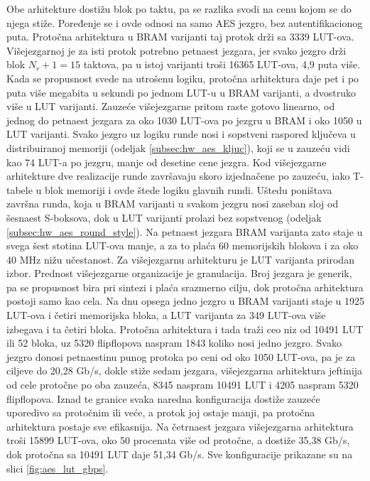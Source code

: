 Obe arhitekture dostižu blok po taktu, pa se razlika svodi na cenu kojom se do njega stiže. Poređenje se i ovde odnosi na samo AES jezgro, bez autentifikacionog puta. Protočna arhitektura u BRAM varijanti taj protok drži sa 3339 LUT-ova. Višejezgarnoj je za isti protok potrebno petnaest jezgara, jer svako jezgro drži blok $N_r + 1 = 15$ taktova, pa u istoj varijanti troši 16365 LUT-ova, 4,9 puta više. Kada se propusnost svede na utrošenu logiku, protočna arhitektura daje pet i po puta više megabita u sekundi po jednom LUT-u u BRAM varijanti, a dvostruko više u LUT varijanti. Zauzeće višejezgarne pritom raste gotovo linearno, od jednog do petnaest jezgara za oko 1030 LUT-ova po jezgru u BRAM i oko 1050 u LUT varijanti. Svako jezgro uz logiku runde nosi i sopstveni raspored ključeva u distribuiranoj memoriji (odeljak \ref{subsec:hw_aes_kljuc}), koji se u zauzeću vidi kao 74 LUT-a po jezgru, manje od desetine cene jezgra.
\smallbreak
Kod višejezgarne arhitekture dve realizacije runde završavaju skoro izjednačene po zauzeću, iako T-tabele u blok memoriji i ovde štede logiku glavnih rundi. Uštedu poništava završna runda, koja u BRAM varijanti u svakom jezgru nosi zaseban sloj od šesnaest S-boksova, dok u LUT varijanti prolazi bez sopstvenog (odeljak \ref{subsec:hw_aes_round_style}). Na petnaest jezgara BRAM varijanta zato staje u svega šest stotina LUT-ova manje, a za to plaća 60 memorijskih blokova i za oko 40 MHz nižu učestanost. Za višejezgarnu arhitekturu je LUT varijanta prirodan izbor.
\smallbreak
Prednost višejezgarne organizacije je granulacija. Broj jezgara je generik, pa se propusnost bira pri sintezi i plaća srazmerno cilju, dok protočna arhitektura postoji samo kao cela. Na dnu opsega jedno jezgro u BRAM varijanti staje u 1925 LUT-ova i četiri memorijska bloka, a LUT varijanta za 349 LUT-ova više izbegava i ta četiri bloka. Protočna arhitektura i tada traži ceo niz od 10491 LUT ili 52 bloka, uz 5320 flipflopova naspram 1843 koliko nosi jedno jezgro. Svako jezgro donosi petnaestinu punog protoka po ceni od oko 1050 LUT-ova, pa je za ciljeve do 20,28 Gb/s, dokle stiže sedam jezgara, višejezgarna arhitektura jeftinija od cele protočne po oba zauzeća, 8345 naspram 10491 LUT i 4205 naspram 5320 flipflopova. Iznad te granice svaka naredna konfiguracija dostiže zauzeće uporedivo sa protočnim ili veće, a protok joj ostaje manji, pa protočna arhitektura postaje sve efikasnija. Na četrnaest jezgara višejezgarna arhitektura troši 15899 LUT-ova, oko 50 procenata više od protočne, a dostiže 35,38 Gb/s, dok protočna sa 10491 LUT daje 51,34 Gb/s. Sve konfiguracije prikazane su na slici \ref{fig:aes_lut_gbps}.

